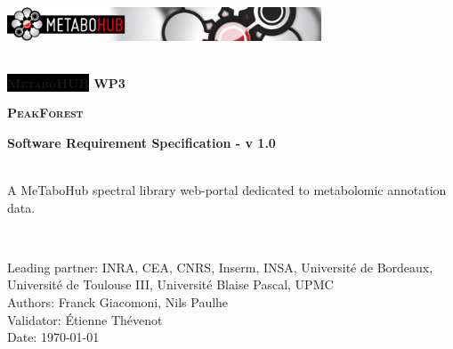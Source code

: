 
\begin{titlepage}

\begin{center}

\includegraphics[width=0.7\textwidth]{./files/images/mth_title.jpg}\\[1cm] 

\HRule \\[0.4cm]
\begin{center} { \textsc{\large { \huge \bfseries \colorbox{Black}{\color{White}Metabo{\color{mthRed}HUB}} WP3 \\}} } \end{center} %
\begin{center} { \textsc{\large { \huge \bfseries PeakForest}} } \end{center} %
\begin{center} { \huge \bfseries Software Requirement Specification - v 1.0} \end{center} 

\HRule \\[0.4cm]

 \large A MeTaboHub spectral library web-portal dedicated to metabolomic  annotation data.

\HRule \\[1.5cm]

\begin{flushleft}
 \large
Leading partner: INRA, CEA, CNRS, Inserm, INSA, Universit\'e de Bordeaux, Universit\'e de Toulouse III, Universit\'e Blaise Pascal, UPMC \\[\baselineskip]
Authors: Franck Giacomoni, Nils Paulhe \\[\baselineskip]
Validator: \'Etienne Th\'evenot \\[\baselineskip]
Date: \today

\let\thefootnote\relax
{}

\end{flushleft}

\vfill

\end{center}

\end{titlepage}